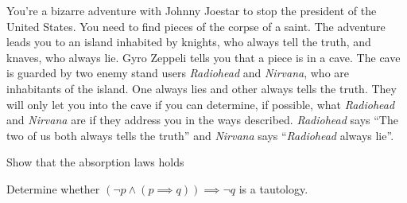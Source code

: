 \documentclass[a4paper]{exam}
\begin{document}
\begin{questions}
     You're a bizarre adventure with Johnny Joestar to stop the president of the United States. You need to find pieces of the corpse of a saint.
    The adventure leads you to an island inhabited by knights, who always tell the truth, and knaves, who always lie. 
    Gyro Zeppeli tells you that a piece is in a cave. The cave is guarded by two enemy stand users \emph{Radiohead} and \emph{Nirvana}, who are inhabitants of the island. One always lies and other always tells the truth.
    They will only let you into the cave if you can determine, if possible, what \emph{Radiohead} and \emph{Nirvana} are if they address you in the ways described.
    \emph{Radiohead} says ``The two of us both always tells the truth'' and \emph{Nirvana} says ``\emph{Radiohead} always lie''.
    \begin{solution}
    \end{solution}

    Show that the absorption laws holds 
    

     Determine whether $(\neg p \land (p \implies q)) \implies \neg q$ is a tautology.



      
\end{questions}
\end{document}

